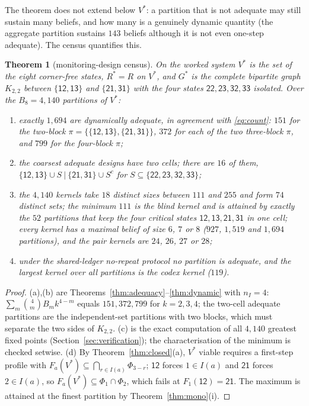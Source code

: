 \documentclass[11pt,a4paper]{article}
\theoremstyle{plain}
\newtheorem{theorem}{Theorem}[section]
\theoremstyle{definition}
\theoremstyle{remark}
\newcommand{\Vstar}{V^{\ast}}
\newcommand{\Rstar}{R^{\ast}}
\newcommand{\Gstar}{G^{\ast}}
\newcommand{\st}[1]{\mathsf{#1}}
\begin{document}
The theorem does not extend below $\Vstar$: a partition that is not adequate may still sustain many beliefs, and how many is a genuinely dynamic quantity (the aggregate partition sustains $143$ beliefs although it is not even one-step adequate). The census quantifies this.

\begin{theorem}[monitoring-design census]\label{thm:censusP}
On the worked system $\Vstar$ is the set of the eight corner-free states, $\Rstar=R$ on $\Vstar$, and $\Gstar$ is the complete bipartite graph $K_{2,2}$ between $\{\st{12},\st{13}\}$ and $\{\st{21},\st{31}\}$ with the four states $\st{22},\st{23},\st{32},\st{33}$ isolated. Over the $B_8=4{,}140$ partitions of $\Vstar$:
\begin{enumerate}[label=(\alph*),leftmargin=2em,itemsep=1pt]
\item exactly $1{,}694$ are dynamically adequate, in agreement with \eqref{eq:count}: $151$ for the two-block $\pi=\{\{\st{12},\st{13}\},\{\st{21},\st{31}\}\}$, $372$ for each of the two three-block $\pi$, and $799$ for the four-block $\pi$;
\item the coarsest adequate designs have two cells; there are $16$ of them, $\{\st{12},\st{13}\}\cup S\ |\ \{\st{21},\st{31}\}\cup S^{c}$ for $S\subseteq\{\st{22},\st{23},\st{32},\st{33}\}$;
\item the $4{,}140$ kernels take $18$ distinct sizes between $111$ and $255$ and form $74$ distinct sets; the minimum $111$ is the blind kernel and is attained by exactly the $52$ partitions that keep the four critical states $\st{12},\st{13},\st{21},\st{31}$ in one cell; every kernel has a maximal belief of size $6$, $7$ or $8$ ($927$, $1{,}519$ and $1{,}694$ partitions), and the pair kernels are $24$, $26$, $27$ or $28$;
\item under the shared-ledger no-repeat protocol no partition is adequate, and the largest kernel over all partitions is the codex kernel ($119$).
\end{enumerate}
\end{theorem}

\begin{proof}
(a),(b) are Theorems~\ref{thm:adequacy}--\ref{thm:dynamic} with $n_I=4$: $\sum_m\binom4m B_m k^{4-m}$ equals $151,372,799$ for $k=2,3,4$; the two-cell adequate partitions are the independent-set partitions with two blocks, which must separate the two sides of $K_{2,2}$. (c) is the exact computation of all $4{,}140$ greatest fixed points (Section~\ref{sec:verification}); the characterisation of the minimum is checked setwise. (d) By Theorem~\ref{thm:closed}(a), $\Vstar$ viable requires a first-step profile with $F_a(\Vstar)\subseteq\bigcap_{r\in I(a)}\Phi_{3-r}$; $\st{12}$ forces $1\in I(a)$ and $\st{21}$ forces $2\in I(a)$, so $F_a(\Vstar)\subseteq\Phi_1\cap\Phi_2$, which fails at $F_1(\st{12})=\st{21}$. The maximum is attained at the finest partition by Theorem~\ref{thm:mono}(i).
\end{proof}
\end{document}
